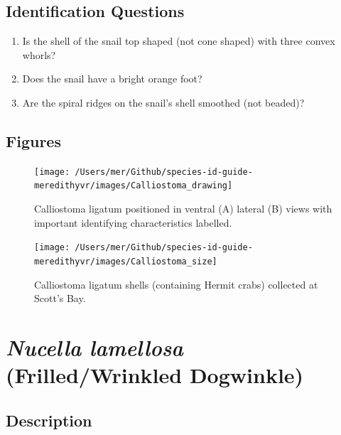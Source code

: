 \documentclass[
]{article}
\begin{document}
\hypertarget{identification-questions}{%
\subsection{Identification Questions}\label{identification-questions}}

\begin{enumerate}
\def\labelenumi{\arabic{enumi})}
\item
  Is the shell of the snail top shaped (not cone shaped) with three
  convex whorls?
\item
  Does the snail have a bright orange foot?
\item
  Are the spiral ridges on the snail's shell smoothed (not beaded)?
\end{enumerate}

\newpage

\hypertarget{figures}{%
\subsection{Figures}\label{figures}}

\begin{figure}

\texttt{[image: /Users/mer/Github/species-id-guide-meredithyvr/images/Calliostoma\_drawing]} \hfill{}

\caption{Calliostoma ligatum positioned in ventral (A) lateral (B) views with important identifying characteristics labelled.}\label{fig:Calliostoma_drawing}
\end{figure}

\begin{figure}

\texttt{[image: /Users/mer/Github/species-id-guide-meredithyvr/images/Calliostoma\_size]} \hfill{}

\caption{Calliostoma ligatum shells (containing Hermit crabs) collected at Scott's Bay.}\label{fig:Calliostoma_size}
\end{figure}

\newpage

\hypertarget{nucella-lamellosa-frilledwrinkled-dogwinkle}{%
\section{\texorpdfstring{\emph{Nucella lamellosa} (Frilled/Wrinkled
Dogwinkle)}{Nucella lamellosa (Frilled/Wrinkled Dogwinkle)}}\label{nucella-lamellosa-frilledwrinkled-dogwinkle}}

\hypertarget{description-1}{%
\subsection{Description}\label{description-1}}
\end{document}
